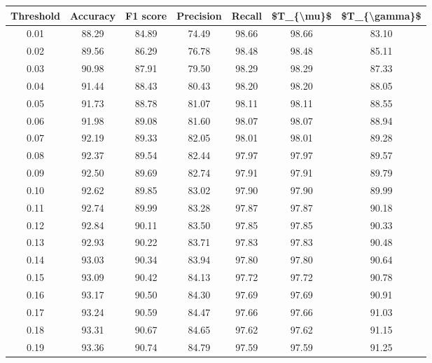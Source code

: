 \begin{tabular}{|c|c|c|c|c|c|c|}
\hline
 Threshold &  Accuracy &  F1 score &  Precision &  Recall &  \$T\_\{\textbackslash mu\}\$ &  \$T\_\{\textbackslash gamma\}\$ \\
\hline
      0.01 &     88.29 &     84.89 &      74.49 &   98.66 &      98.66 &         83.10 \\
      0.02 &     89.56 &     86.29 &      76.78 &   98.48 &      98.48 &         85.11 \\
      0.03 &     90.98 &     87.91 &      79.50 &   98.29 &      98.29 &         87.33 \\
      0.04 &     91.44 &     88.43 &      80.43 &   98.20 &      98.20 &         88.05 \\
      0.05 &     91.73 &     88.78 &      81.07 &   98.11 &      98.11 &         88.55 \\
      0.06 &     91.98 &     89.08 &      81.60 &   98.07 &      98.07 &         88.94 \\
      0.07 &     92.19 &     89.33 &      82.05 &   98.01 &      98.01 &         89.28 \\
      0.08 &     92.37 &     89.54 &      82.44 &   97.97 &      97.97 &         89.57 \\
      0.09 &     92.50 &     89.69 &      82.74 &   97.91 &      97.91 &         89.79 \\
      0.10 &     92.62 &     89.85 &      83.02 &   97.90 &      97.90 &         89.99 \\
      0.11 &     92.74 &     89.99 &      83.28 &   97.87 &      97.87 &         90.18 \\
      0.12 &     92.84 &     90.11 &      83.50 &   97.85 &      97.85 &         90.33 \\
      0.13 &     92.93 &     90.22 &      83.71 &   97.83 &      97.83 &         90.48 \\
      0.14 &     93.03 &     90.34 &      83.94 &   97.80 &      97.80 &         90.64 \\
      0.15 &     93.09 &     90.42 &      84.13 &   97.72 &      97.72 &         90.78 \\
      0.16 &     93.17 &     90.50 &      84.30 &   97.69 &      97.69 &         90.91 \\
      0.17 &     93.24 &     90.59 &      84.47 &   97.66 &      97.66 &         91.03 \\
      0.18 &     93.31 &     90.67 &      84.65 &   97.62 &      97.62 &         91.15 \\
      0.19 &     93.36 &     90.74 &      84.79 &   97.59 &      97.59 &         91.25 \\

\end{tabular}
